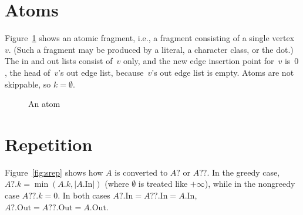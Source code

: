 \documentclass{article}
\newcommand*{\In}{\mathrm{In}}
\newcommand*{\Out}{\mathrm{Out}}
\begin{document}
\section{Atoms}

Figure~\ref{fig:atom} shows an atomic fragment, i.e., a fragment consisting of a single vertex~$v$. (Such a fragment may be produced by a literal, a character class, or the dot.) The in and out lists consist of~$v$ only, and the new edge insertion point for~$v$ is~$0$, the head of~$v$'s out edge list, because~$v$'s out edge list is empty. Atoms are not skippable, so $k = \emptyset$.

\begin{figure}
\centering
{}
\caption{An atom\label{fig:atom}}
\end{figure}

\section{Repetition}

Figure~\ref{fig:srep} shows how $A$ is converted to $A?$ or $A??$. In the greedy case, $A?.k = \min(A.k,\lvert A.\In\rvert)$ (where $\emptyset$ is treated like $+\infty$), while in the nongreedy case $A??.k = 0$. In both cases $A?.\In = A??.\In = A.\In$, $A?.\Out = A??.\Out = A.\Out$.
\end{document}
